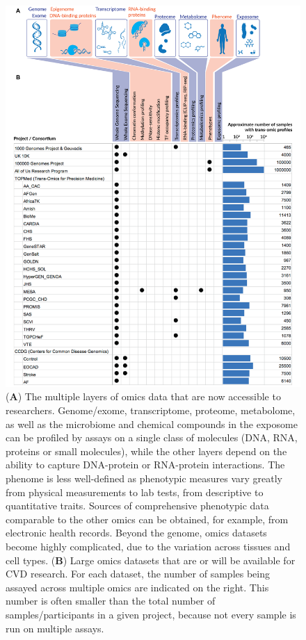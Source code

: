 \documentclass[letter]{bioinfo}
\begin{document}
    	\begin{figure}[!tpb]
	\includegraphics[width=1\linewidth]{trans-omics-data-sets.png}
		\caption{(\textbf{A}) The multiple layers of omics data that are now accessible to researchers. Genome/exome, transcriptome, proteome, metabolome, as well as the microbiome and chemical compounds in the exposome can be profiled by assays on a single class of molecules (DNA, RNA, proteins or small molecules), while the other layers depend on the ability to capture DNA-protein or RNA-protein interactions. The phenome is less well-defined as phenotypic measures vary greatly from physical measurements to lab tests, from descriptive to quantitative traits. Sources of comprehensive phenotypic data comparable to the other omics can be obtained, for example, from electronic health records.
		Beyond the genome, omics datasets become highly complicated, due to the variation across tissues and cell types.
		(\textbf{B}) Large omics datasets that are or will be available for CVD research. For each dataset, the number of samples being assayed across multiple omics are indicated on the right. This number is often smaller than the total number of samples/participants in a given project, because not every sample is run on multiple assays.}
		\label{fig:trans-omics}
	\end{figure} 
	
\end{document}
